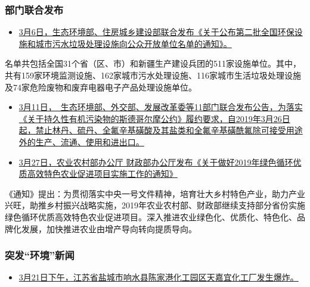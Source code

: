 \documentclass[
]{book}
\providecommand{\tightlist}{%
  \setlength{\itemsep}{0pt}\setlength{\parskip}{0pt}}
\begin{document}
\hypertarget{ux90e8ux95e8ux8054ux5408ux53d1ux5e03-4}{%
\subsubsection*{部门联合发布}\label{ux90e8ux95e8ux8054ux5408ux53d1ux5e03-4}}

\begin{itemize}
\tightlist
\item
  \href{http://www.mee.gov.cn/xxgk2018/xxgk/xxgk05/201903/t20190308_694926.html}{3月6日，生态环境部、住房城乡建设部联合发布《关于公布第二批全国环保设施和城市污水垃圾处理设施向公众开放单位名单的通知》。}
\end{itemize}

名单共包括全国31个省（区、市）和新疆生产建设兵团的511家设施单位。其中，共有159家环境监测设施、162家城市污水处理设施、116家城市生活垃圾处理设施及74家危险废物和废弃电器电子产品处理设施单位。

\begin{itemize}
\item
  \href{http://www.mee.gov.cn/xxgk2018/xxgk/xxgk01/201903/t20190312_695462.html}{3月11日，　生态环境部、外交部、发展改革委等11部门联合发布公告，为落实《关于持久性有机污染物的斯德哥尔摩公约》履约要求，自2019年3月26日起，禁止林丹、硫丹、全氟辛基磺酸及其盐类和全氟辛基磺酰氟除可接受用途外的生产、流通、使用和进出口。}
\item
  \href{http://www.moa.gov.cn/gk/tzgg_1/tfw/201903/t20190327_6177367.htm}{3月27日，农业农村部办公厅 财政部办公厅发布《关于做好2019年绿色循环优质高效特色农业促进项目实施工作的通知》}
\end{itemize}

《通知》提出：为贯彻落实中央一号文件精神，培育壮大乡村特色产业，助力产业兴旺，助推乡村振兴战略实施，2019年农业农村部、财政部继续支持部分省份实施绿色循环优质高效特色农业促进项目。深入推进农业绿色化、优质化、特色化、品牌化发展，加快推进农业由增产导向转向提质导向。

\hypertarget{ux7a81ux53d1ux73afux5883ux65b0ux95fb}{%
\subsubsection*{突发``环境''新闻}\label{ux7a81ux53d1ux73afux5883ux65b0ux95fb}}

\begin{itemize}
\tightlist
\item
  \href{http://www.chinasafety.gov.cn/xw/byw/201903/t20190323_232262.shtml}{3月21日下午，江苏省盐城市响水县陈家港化工园区天嘉宜化工厂发生爆炸。}
\end{itemize}
\end{document}
